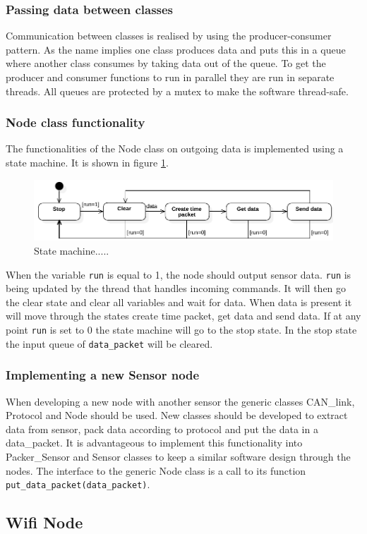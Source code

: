 \subsubsection*{Passing data between classes}
Communication between classes is realised by using the producer-consumer pattern.
As the name implies one class produces data and puts this in a queue where another class consumes by taking data out of the queue.
To get the producer and consumer functions to run in parallel they are run in separate threads.
All queues are protected by a mutex to make the software thread-safe.

\subsubsection*{Node class functionality}
The functionalities of the Node class on outgoing data is implemented using a state machine.
It is shown in figure \ref{fig:state_machine}.
\begin{figure}[!h]
\centering
\includegraphics[width=1\textwidth]{graphics/StateDiagram_Node.pdf}
\caption{State machine.....}
\label{fig:state_machine}
\end{figure}
When the variable \texttt{run} is equal to 1, the node should output sensor data.
\texttt{run} is being updated by the thread that handles incoming commands.
It will then go the clear state and clear all variables and wait for data. 
When data is present it will move through the states create time packet, get data and send data. 
If at any point \texttt{run} is set to 0 the state machine will go to the stop state.
In the stop state the input queue of \texttt{data\_packet} will be cleared.

\subsubsection*{Implementing a new Sensor node}
When developing a new node with another sensor the generic classes CAN\_link, Protocol and Node should be used. 
New classes should be developed to extract data from sensor, pack data according to protocol and put the data in a data\_packet.
It is advantageous to implement this functionality into Packer\_Sensor and Sensor classes to keep a similar software design through the nodes.
The interface to the generic Node class is a call to its function \texttt{put\_data\_packet(data\_packet)}.

\subsection{Wifi Node}

